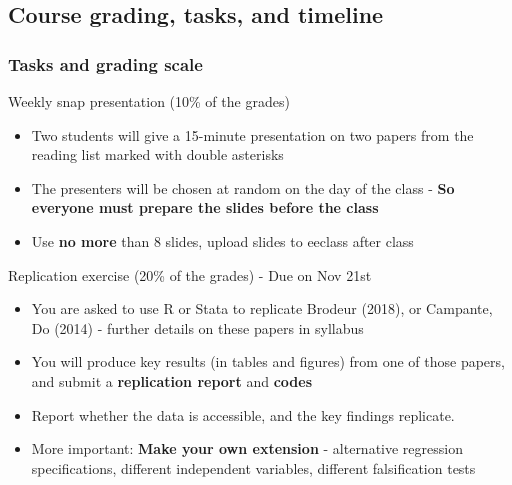 \documentclass[aspectratio=169]{beamer}
\newenvironment{wideitemize}{\itemize\addtolength{\itemsep}{10pt}}{\enditemize}
\begin{document}
\subsection{Course grading, tasks, and timeline}
\begin{frame}
\frametitle{Tasks and grading scale} 
\begin{wideitemize}
\item Weekly snap presentation (10\% of the grades)
\begin{itemize}
\item Two students will give a 15-minute presentation on two papers from the reading list marked with double asterisks
\item The presenters will be chosen at random on the day of the class - \textbf{So everyone must prepare the slides before the class}
\item Use \textbf{no more} than 8 slides, upload slides to eeclass after class
\end{itemize}
\item Replication exercise (20\% of the grades) - Due on Nov 21st
\begin{itemize}
\item You are asked to use R or Stata to replicate Brodeur (2018), or Campante, Do (2014) - further details on these papers in syllabus
\item You will produce key results (in tables and figures) from one of those papers, and submit a \textbf{replication report} and \textbf{codes}
\item Report whether the data is accessible, and the key findings replicate. 
\item More important: \textbf{Make your own extension} - alternative regression specifications, different independent variables, different falsification tests
\end{itemize}
\end{wideitemize}
\end{frame}
\end{document}
